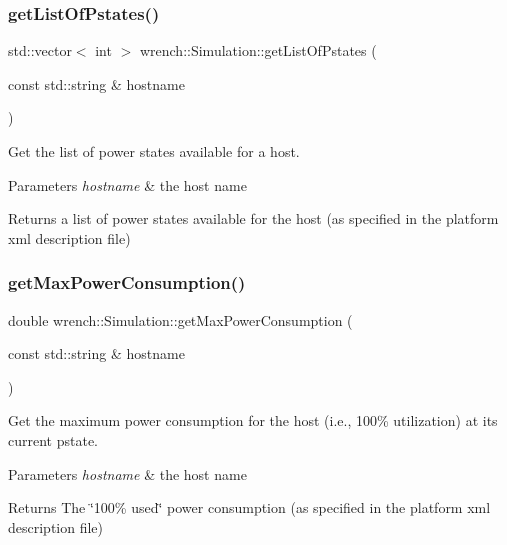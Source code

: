 \subsubsection{\texorpdfstring{get\+List\+Of\+Pstates()}{getListOfPstates()}}
{\footnotesize\ttfamily std\+::vector$<$ int $>$ wrench\+::\+Simulation\+::get\+List\+Of\+Pstates (\begin{DoxyParamCaption}\item[{const std\+::string \&}]{hostname }\end{DoxyParamCaption})\hspace{0.3cm}{\ttfamily [static]}}



Get the list of power states available for a host. 


\begin{DoxyParams}{Parameters}
{\em hostname} & the host name \\
\hline
\end{DoxyParams}
\begin{DoxyReturn}{Returns}
a list of power states available for the host (as specified in the platform xml description file) 
\end{DoxyReturn}
\mbox{\label{classwrench_1_1_simulation_ae76b92ce868c6e6c1683377d869a5b34}} 
\subsubsection{\texorpdfstring{get\+Max\+Power\+Consumption()}{getMaxPowerConsumption()}}
{\footnotesize\ttfamily double wrench\+::\+Simulation\+::get\+Max\+Power\+Consumption (\begin{DoxyParamCaption}\item[{const std\+::string \&}]{hostname }\end{DoxyParamCaption})\hspace{0.3cm}{\ttfamily [static]}}



Get the maximum power consumption for the host (i.\+e., 100\% utilization) at its current pstate. 


\begin{DoxyParams}{Parameters}
{\em hostname} & the host name \\
\hline
\end{DoxyParams}
\begin{DoxyReturn}{Returns}
The \char`\"{}100\% used\char`\"{} power consumption (as specified in the platform xml description file) 
\end{DoxyReturn}
\mbox{\label{classwrench_1_1_simulation_afdf2ae84f6b3c8b51c5189199bebb52e}} 
